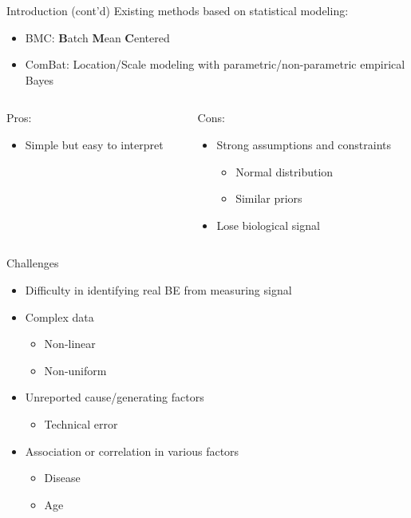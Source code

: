 \documentclass{beamer}
\begin{document}
\begin{frame}{Introduction (cont'd)}
  Existing methods based on statistical modeling:
  \begin{itemize}
      \item BMC: \textbf{B}atch \textbf{M}ean \textbf{C}entered
      \parencite{Sims2008}
    \item ComBat: Location/Scale modeling with parametric/non-parametric empirical Bayes \parencite{Johnson2006}
  \end{itemize}
  \vspace{1cm}
  \begin{columns}
    \begin{column}[t]{.48\textwidth}
      Pros:
      \begin{itemize}
        \item Simple but easy to interpret
      \end{itemize}
    \end{column}
    \begin{column}[t]{.48\textwidth}
      Cons:
      \begin{itemize}
        \item Strong assumptions and constraints
          \begin{itemize}
            \item Normal distribution
            \item Similar priors
          \end{itemize}
        \item Lose biological signal
      \end{itemize}
    \end{column}
  \end{columns}
\end{frame}

\begin{frame}{Challenges}
  \begin{itemize}
    \item Difficulty in identifying real BE from measuring signal
    \item Complex data
      \begin{itemize}
        \item Non-linear
        \item Non-uniform
      \end{itemize}
    \item Unreported cause/generating factors
      \begin{itemize}
        \item Technical error
      \end{itemize}
    \item Association or correlation in various factors
      \begin{itemize}
        \item Disease
          \item Age
      \end{itemize}
  \end{itemize}
\end{frame}
\end{document}
